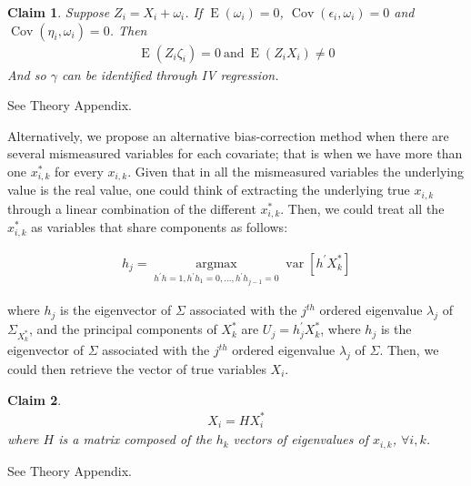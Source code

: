 \documentclass[10pt]{article}
\makeatletter
\newtheorem{claim}{Claim}
\renewenvironment{proof}[1][\proofname] {\par\pushQED{\qed}\normalfont\topsep6\p@\@plus6\p@\relax\trivlist\item[\hskip\labelsep\bfseries#1\@addpunct{.}]\ignorespaces}{\popQED\endtrivlist\@endpefalse}
\makeatother
\begin{document}
        \begin{claim}
        Suppose $ Z_i=X_i+\omega_i$. If $\operatorname{E}(\omega_i)=0$, $\operatorname{Cov}(\epsilon_i,\omega_i)=0$ and $\operatorname{Cov}(\eta_i,\omega_i)=0$. Then
        \begin{align}
        \operatorname{E}(Z_i\zeta_i)=0 \ \text{and} \  \operatorname{E}(Z_iX_i)\neq0
        \end{align}
        And so $\gamma$ can be identified through IV regression.
        \end{claim}

        \begin{proof}
        See Theory Appendix.
        \end{proof}
        
        Alternatively, we propose an alternative bias-correction method when there are several mismeasured variables for each covariate; that is when we have more than one $x_{i,k}^*$ for every $x_{i,k}$. Given that in all the mismeasured variables the underlying value is the real value, one could think of extracting the underlying true $x_{i,k}$ through a linear combination of the different $x_{i,k}^*$. Then, we could treat all the $x_{i,k}^*$ as variables that share components as follows:

        \begin{align} \label{variance_max}
           h_{j}=\underset{h^{\prime} h=1, h^{\prime} h_{1}=0, \ldots, h^{\prime} h_{j-1}=0}{\operatorname{argmax}} \operatorname{var}\left[h^{\prime} X^*_k\right]  
        \end{align}
        
        where $h_j$ is the eigenvector of $\Sigma$ associated with the $j^{t h}$ ordered eigenvalue $\lambda_{j}$ of $\Sigma_{X^*_k}$, and the principal components of $X^*_k$ are $U_{j}=h_{j}^{\prime} X^*_k$, where $h_{j}$ is the eigenvector of $\Sigma$ associated with the $j^{t h}$ ordered eigenvalue $\lambda_{j}$ of $\Sigma$. Then, we could then retrieve the vector of true variables $X_i$.

        \begin{claim} \label{linear_combo}
            \begin{align}
                X_i=HX^*_i
            \end{align}
        where $H$ is a matrix composed of the $h_k$ vectors of eigenvalues of $x_{i,k}$, $\forall i,k$.
        \end{claim}

        \begin{proof}
            See Theory Appendix.
        \end{proof}
 
\end{document}
